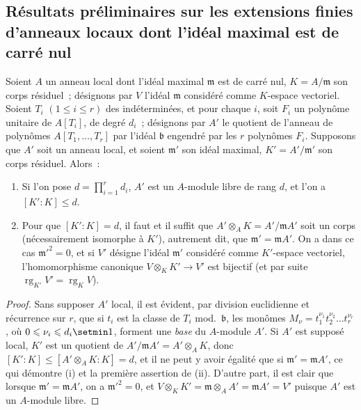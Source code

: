 \subsection{Résultats préliminaires sur les extensions finies d'anneaux locaux dont l'idéal maximal est de carré nul}
\label{subsection:0.22.4-fr}
\label{0.22.4-fr}

\begin{proposition}[22.4.1]
\label{0.22.4.1-fr}
Soient $A$ un anneau local dont l'idéal maximal $\mathfrak m$ est de carré
nul, $K=A/\mathfrak m$ son corps résiduel~; désignons par $V$ l'idéal
$\mathfrak m$ considéré comme $K$-espace vectoriel. Soient $T_i$
$(1\leqslant i\leqslant r)$ des indéterminées, et pour chaque $i$, soit
$F_i$ un polynôme unitaire de $A[T_i]$, de degré $d_i$~; désignons par $A'$ le
quotient de l'anneau de polynômes $A[T_1,\ldots,T_r]$ par l'idéal
$\mathfrak b$ engendré par les $r$ polynômes $F_i$. Supposons que $A'$ soit
un anneau local, et soient $\mathfrak m'$ son idéal maximal,
$K'=A'/\mathfrak m'$ son corps résiduel. Alors~:
\begin{enumerate}
  \item[\textup{(i)}] Si l'on pose $d=\prod_{i=1}^r d_i$, $A'$ est un $A$-module
  libre de rang $d$, et l'on a $[K':K]\leqslant d$.
  \item[\textup{(ii)}] Pour que $[K':K]=d$, il faut et il suffit que
  $A'\otimes_AK=A'/\mathfrak mA'$ soit un corps (nécessairement isomorphe à
  $K'$), autrement dit, que $\mathfrak m'=\mathfrak mA'$. On a dans ce cas
  $\mathfrak m'^2=0$, et si $V'$ désigne l'idéal $\mathfrak m'$ considéré
  comme $K'$-espace vectoriel, l'homomorphisme canonique
  $V\otimes_KK'\to V'$ est bijectif (et par suite
  $\operatorname{rg}_{K'}V'=\operatorname{rg}_K V$).
\end{enumerate}
\end{proposition}

\begin{proof}
Sans supposer $A'$ local, il est évident, par division euclidienne et
récurrence sur $r$, que si $t_i$ est la classe de $T_i$ mod.~$\mathfrak b$,
les monômes
$M_\nu=t_1^{\nu_1}t_2^{\nu_2}\ldots t_r^{\nu_r}$, où
$0\leqslant\nu_i\leqslant d_i\setmin 1$, forment une \emph{base} du $A$-module $A'$. Si
$A'$ est supposé local, $K'$ est un quotient de
$A'/\mathfrak mA'=A'\otimes_AK$, donc
$[K':K]\leqslant[A'\otimes_AK:K]=d$, et il ne peut y avoir égalité que si
$\mathfrak m'=\mathfrak mA'$, ce qui démontre (i) et la première assertion
de (ii). D'autre part, il est clair que lorsque
$\mathfrak m'=\mathfrak mA'$, on a $\mathfrak m'^2=0$, et
$V\otimes_KK'=\mathfrak m\otimes_AA'=\mathfrak mA'=V'$ puisque $A'$ est
un $A$-module libre.
\end{proof}

